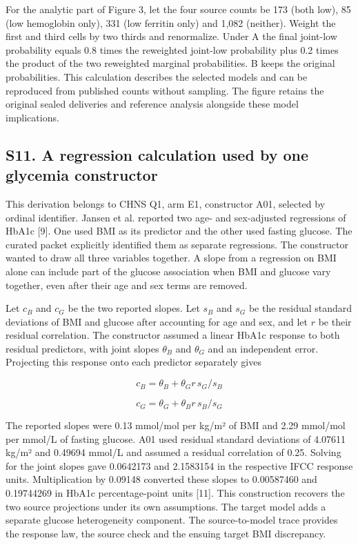 \documentclass[11pt,letterpaper]{article}
\begin{document}
For the analytic part of Figure 3, let the four source counts be 173 (both low), 85 (low hemoglobin only), 331 (low ferritin only) and 1,082 (neither). Weight the first and third cells by two thirds and renormalize. Under A the final joint-low probability equals 0.8 times the reweighted joint-low probability plus 0.2 times the product of the two reweighted marginal probabilities. B keeps the original probabilities. This calculation describes the selected models and can be reproduced from published counts without sampling. The figure retains the original sealed deliveries and reference analysis alongside these model implications.


\subsection*{S11. A regression calculation used by one glycemia constructor}

This derivation belongs to CHNS Q1, arm E1, constructor A01, selected by ordinal identifier. Jansen et al. reported two age- and sex-adjusted regressions of HbA1c [9]. One used BMI as its predictor and the other used fasting glucose. The curated packet explicitly identified them as separate regressions. The constructor wanted to draw all three variables together. A slope from a regression on BMI alone can include part of the glucose association when BMI and glucose vary together, even after their age and sex terms are removed.


Let \(c_B\) and \(c_G\) be the two reported slopes. Let \(s_B\) and \(s_G\) be the residual standard deviations of BMI and glucose after accounting for age and sex, and let \(r\) be their residual correlation. The constructor assumed a linear HbA1c response to both residual predictors, with joint slopes \(\theta_B\) and \(\theta_G\) and an independent error. Projecting this response onto each predictor separately gives


\[
c_B = \theta_B + \theta_G r\,s_G/s_B
\]

\[
c_G = \theta_G + \theta_B r\,s_B/s_G
\]

The reported slopes were 0.13 mmol/\allowbreak{}mol per kg/\allowbreak{}m² of BMI and 2.29 mmol/\allowbreak{}mol per mmol/\allowbreak{}L of fasting glucose. A01 used residual standard deviations of 4.07611 kg/\allowbreak{}m² and 0.49694 mmol/\allowbreak{}L and assumed a residual correlation of 0.25. Solving for the joint slopes gave 0.0642173 and 2.1583154 in the respective IFCC response units. Multiplication by 0.09148 converted these slopes to 0.00587460 and 0.19744269 in HbA1c percentage-point units [11]. This construction recovers the two source projections under its own assumptions. The target model adds a separate glucose heterogeneity component. The source-to-model trace provides the response law, the source check and the ensuing target BMI discrepancy.
\end{document}
